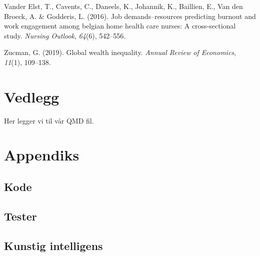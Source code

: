 \documentclass[
  12pt,
  a4paper,
  DIV=11,
  numbers=noendperiod]{scrartcl}
\newlength{\cslhangindent}
\newenvironment{CSLReferences}[2] %
 {\begin{list}{}{%
  \setlength{\itemindent}{0pt}
  \setlength{\leftmargin}{0pt}
  \setlength{\parsep}{0pt}
  \ifodd #1
   \setlength{\leftmargin}{\cslhangindent}
   \setlength{\itemindent}{-1\cslhangindent}
  \fi
  \setlength{\itemsep}{#2\baselineskip}}}
 {\end{list}}
\begin{document}
\begin{CSLReferences}{1}{0}
Vander Elst, T., Cavents, C., Daneels, K., Johannik, K., Baillien, E.,
Van den Broeck, A. \& Godderis, L. (2016). Job demands--resources
predicting burnout and work engagement among belgian home health care
nurses: A cross-sectional study. \emph{Nursing Outlook}, \emph{64}(6),
542--556.

Zucman, G. (2019). Global wealth inequality. \emph{Annual Review of
Economics}, \emph{11}(1), 109--138.

\end{CSLReferences}

\newpage

\section*{Vedlegg}\label{vedlegg}

Her legger vi til vår QMD fil.

\section*{Appendiks}\label{appendiks}

\subsection*{Kode}\label{kode}

\subsection*{Tester}\label{tester}

\subsection*{Kunstig intelligens}\label{kunstig-intelligens}
\end{document}
